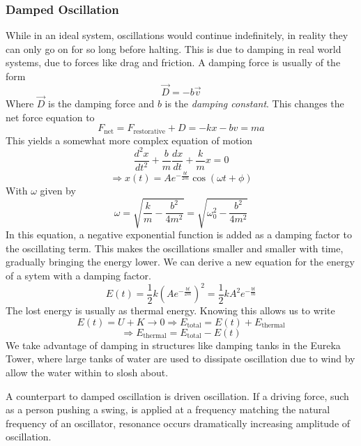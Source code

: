 \documentclass[12pt]{report}
\begin{document}
\begin{flushleft}
\subsubsection*{Damped Oscillation}
While in an ideal system, oscillations would continue indefinitely, in reality
they can only go on for so long before halting. This is due to damping in
real world systems, due to forces like drag and friction. A damping force
is usually of the form
\[\vec{D} = -b\vec{v}\]
Where \(\vec{D}\) is the damping force and \(b\) is the \textit{damping
constant}. This changes the net force equation to
\[F_\mathrm{net} = F_\mathrm{restorative} + D = -kx - bv = ma\]
This yields a somewhat more complex equation of motion
\[\frac{d^2x}{dt^2} + \frac{b}{m}\frac{dx}{dt} + \frac{k}{m}x = 0\]
\[\Rightarrow x(t) = Ae^{-\frac{bt}{2m}}\cos(\omega t + \phi)\]
With \(\omega\) given by
\[\omega = \sqrt{\frac{k}{m} - \frac{b^2}{4m^2}} 
= \sqrt{\omega_0^2 - \frac{b^2}{4m^2}}\]
In this equation, a negative exponential function is added as a damping factor
to the oscillating term. This makes the oscillations smaller and smaller with
time, gradually bringing the energy lower. We can derive a new equation for
the energy of a sytem with a damping factor.
\[E(t) = \frac{1}{2}k\left(Ae^{-\frac{bt}{2m}}\right)^2 
= \frac{1}{2}kA^2e^{-\frac{bt}{m}}\]
The lost energy is usually as thermal energy. Knowing this allows us to write
\[E(t) = U + K \rightarrow 0 \Rightarrow 
E_\mathrm{total} = E(t) + E_\mathrm{thermal}\]
\[\Rightarrow E_\mathrm{thermal} = E_\mathrm{total} - E(t)\]
We take advantage of damping in structures like damping tanks in the Eureka
Tower, where large tanks of water are used to dissipate oscillation due to wind
by allow the water within to slosh about.

\bigskip
A counterpart to damped oscillation is driven oscillation. If a driving
force, such as a person pushing a swing, is applied at a frequency matching
the natural frequency of an oscillator, resonance occurs dramatically 
increasing amplitude of oscillation.

\end{flushleft}
\end{document}
